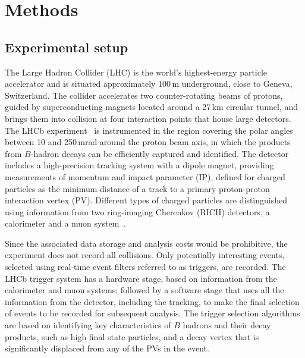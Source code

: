 \newpage
\section*{Methods}
\subsection*{Experimental setup}

The Large Hadron Collider (LHC) is the world’s highest-energy particle accelerator and is situated approximately 100\,m underground, close to Geneva, Switzerland. The collider accelerates two counter-rotating beams of protons, guided by superconducting magnets located around a 27\,km circular tunnel, and brings them into collision at four interaction points that house large detectors. The LHCb experiment~\cite{Alves:2008zz,LHCb-DP-2014-002} is instrumented in the region covering the polar angles between 10 and 250\,mrad around the proton beam axis, in which the products from $B$-hadron decays can be efficiently captured and identified. The detector includes a high-precision tracking system with a dipole magnet, providing measurements of momentum and impact parameter (IP), defined for charged particles as the minimum distance of a track to a primary proton-proton interaction vertex (PV). Different types of charged particles are distinguished using information from two ring-imaging Cherenkov (RICH) detectors, a calorimeter and a muon system~\cite{LHCb-DP-2014-002, LHCb-DP-2014-001, LHCb-DP-2013-003,LHCb-DP-2013-001,LHCb-DP-2012-003,LHCb-DP-2012-002}. 

Since the associated data storage and analysis costs would be prohibitive, the experiment does not record all collisions. 
Only potentially interesting events, selected using real-time event filters referred to as triggers, are recorded.
The LHCb trigger system has a hardware stage, based on information from the calorimeter and muon systems; followed by a software stage that uses all the information from the detector, including the tracking, to make the final selection of events to be recorded for subsequent analysis. The trigger selection algorithms are based on identifying key characteristics of $B$ hadrons and their decay products, such as high \pt final state particles, and a decay vertex that is significantly displaced from any of the PVs in the event.

